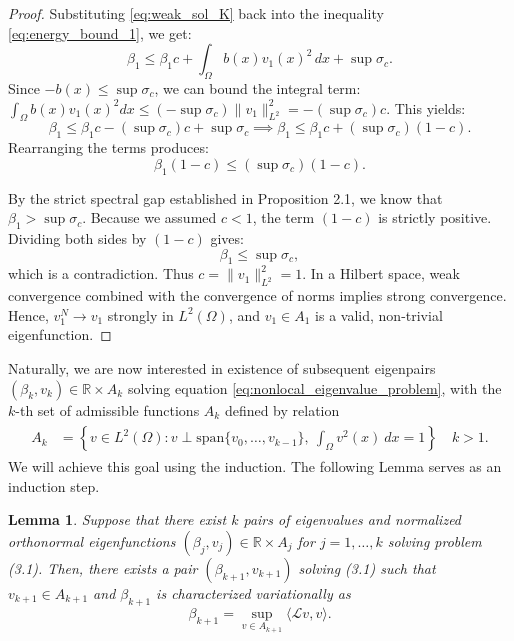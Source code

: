 \documentclass[11pt, a4paper]{article}
\theoremstyle{break}
\theoremstyle{break}
\theoremstyle{break}
\theoremstyle{break}
\theoremstyle{break}
\newtheorem{lem}{Lemma}[section]
\theoremstyle{break}
\theoremstyle{break}
\theoremstyle{break}
\theoremstyle{break}
\begin{document}
\begin{proof}
    Substituting \eqref{eq:weak_sol_K} back into the inequality \eqref{eq:energy_bound_1}, we get:
    \begin{equation}
        \beta_1 \leq \beta_1 c + \int_\Omega b(x) v_1(x)^2 \, dx + \sup \sigma_c.
    \end{equation}
    Since $-b(x) \leq \sup \sigma_c$, we can bound the integral term: $\int_\Omega b(x) v_1(x)^2 dx \leq (-\sup \sigma_c) \|v_1\|_{L^2}^2 = -(\sup \sigma_c) c$. This yields:
    \begin{equation}
        \beta_1 \leq \beta_1 c - (\sup \sigma_c) c + \sup \sigma_c \implies \beta_1 \leq \beta_1 c + (\sup \sigma_c)(1 - c).
    \end{equation}
    Rearranging the terms produces:
    \begin{equation}
        \beta_1(1 - c) \leq (\sup \sigma_c)(1 - c).
    \end{equation}
    
    By the strict spectral gap established in Proposition 2.1, we know that $\beta_1 > \sup \sigma_c$. Because we assumed $c < 1$, the term $(1 - c)$ is strictly positive. Dividing both sides by $(1 - c)$ gives:
    \begin{equation}
        \beta_1 \leq \sup \sigma_c,
    \end{equation}
    which is a contradiction. Thus $c = \|v_1\|_{L^2}^2 = 1$. In a Hilbert space, weak convergence combined with the convergence of norms implies strong convergence. Hence, $v_1^N \to v_1$ strongly in $L^2(\Omega)$, and $v_1 \in A_1$ is a valid, non-trivial eigenfunction.
\end{proof}

Naturally, we are now interested in existence of subsequent eigenpairs $(\beta_k, v_k) \in \mathbb{R}\times A_k$ solving equation \eqref{eq:nonlocal_eigenvalue_problem}, with the $k$-th set of admissible functions $A_k$ defined by relation
\begin{align}
    \begin{split}
        A_k &= \left\{ v \in L^2(\Omega): v \perp \text{span}\{v_0, \ldots, v_{k-1}\}, \: \int_\Omega v^2(x) \: dx = 1 \right\} \quad k > 1.
    \end{split}
\end{align}
We will achieve this goal using the induction. The following Lemma serves as an induction step.

\begin{lem}
    \label{lem:inductive_step}
    Suppose that there exist $k$ pairs of eigenvalues and normalized orthonormal eigenfunctions $(\beta_j, v_j) \in \mathbb{R} \times A_j$ for $j=1, \ldots, k$ solving problem (3.1). Then, there exists a pair $(\beta_{k+1}, v_{k+1})$ solving (3.1) such that $v_{k+1} \in A_{k+1}$ and $\beta_{k+1}$ is characterized variationally as
    \begin{equation}
        \label{eq:eigenvalue_problem_k_plus_1}
        \beta_{k+1} = \sup_{v \in A_{k+1}} \langle \mathcal{L} v, v \rangle.
    \end{equation}
\end{lem}
\end{document}

